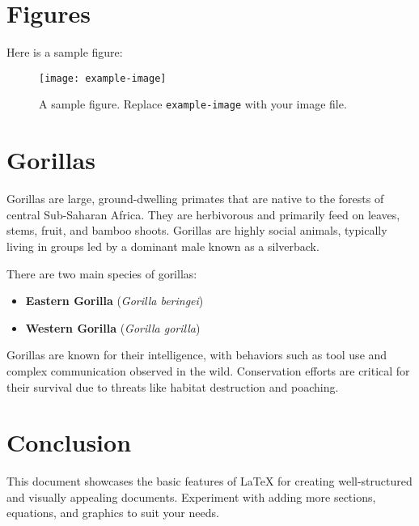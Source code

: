 \documentclass{article}
\begin{document}
\section{Figures}
Here is a sample figure:
\begin{figure}[h!]
\centering
\texttt{[image: example-image]}
\caption{A sample figure. Replace \texttt{example-image} with your image file.}
\label{fig:sample_figure}
\end{figure}

\section{Gorillas}
Gorillas are large, ground-dwelling primates that are native to the forests of central Sub-Saharan Africa. They are herbivorous and primarily feed on leaves, stems, fruit, and bamboo shoots. Gorillas are highly social animals, typically living in groups led by a dominant male known as a silverback.

There are two main species of gorillas:
\begin{itemize}
    \item \textbf{Eastern Gorilla} (\textit{Gorilla beringei})
    \item \textbf{Western Gorilla} (\textit{Gorilla gorilla})
\end{itemize}

Gorillas are known for their intelligence, with behaviors such as tool use and complex communication observed in the wild. Conservation efforts are critical for their survival due to threats like habitat destruction and poaching.

\section{Conclusion}
This document showcases the basic features of \LaTeX{} for creating well-structured and visually appealing documents. Experiment with adding more sections, equations, and graphics to suit your needs.
\end{document}
